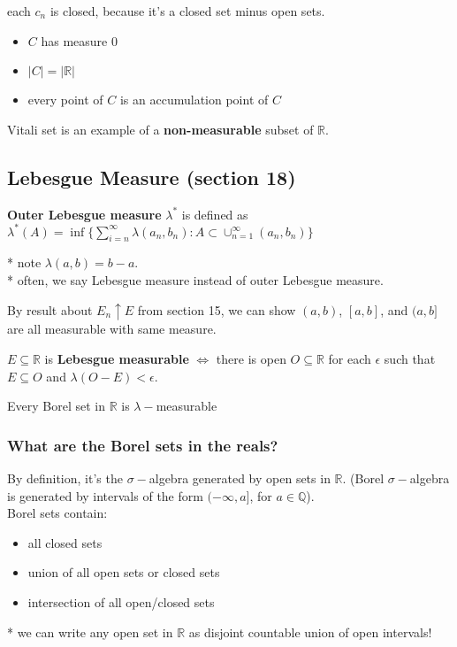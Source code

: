 \documentclass[a4paper, 12pt]{article}
\def\R{\ensuremath{\mathbb{R}}} %
\def\Q{\ensuremath{\mathbb{Q}}}
\newcommand{\bt}[1]{\textbf{#1}} %
\begin{document}
\begin{multicols}{2}
each $c_n$ is closed, because it's a closed set minus open sets.

\begin{itemize}
    \item $C$ has measure 0
    \item $|C| = |\R|$
    \item every point of $C$ is an accumulation point of $C$
\end{itemize}

Vitali set is an example of a \bt{non-measurable} subset of $\R$.

\subsection{Lebesgue Measure (section 18)}

\bt{Outer Lebesgue measure} $\lambda^*$ is defined as 
$\lambda^*(A) = \inf \{ \sum_{i=n}^\infty \lambda(a_n, b_n) : A \subset \cup_{n=1}^\infty (a_n, b_n)\}$ 

* note $\lambda(a, b) = b - a$.\\
* often, we say Lebesgue measure instead of outer Lebesgue measure. 

By result about $E_n \uparrow E$ from section 15, we can show 
$(a, b)$, $[a, b]$, and $(a, b]$ are all measurable with same measure.

$E \subseteq \R$ is \bt{Lebesgue measurable} $\iff$ there is open $O \subseteq \R$ for each $\epsilon$ such that 
$E \subseteq O$ and $\lambda(O - E) < \epsilon$.

Every Borel set in $\R$ is $\lambda-$measurable

\subsubsection{What are the Borel sets in the reals?}
By definition, it's the $\sigma-$algebra generated by open sets in $\R$.
(Borel $\sigma-$algebra is generated by intervals of the form $(-\infty, a]$, for 
$a \in \Q$). \\
Borel sets contain:
\begin{itemize}
    \item all closed sets 
    \item union of all open sets or closed sets
    \item intersection of all open/closed sets
\end{itemize}

* we can write any open set in $\R$ as disjoint countable union of open intervals!

\end{multicols}
\end{document}
